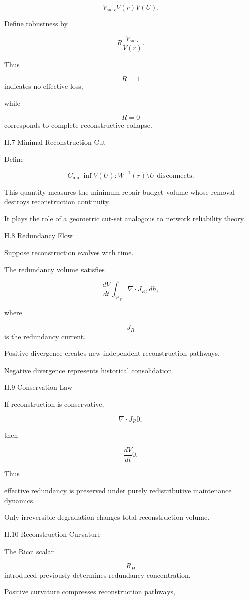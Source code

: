 \documentclass[12pt,oneside]{article}
\theoremstyle{plain}
\theoremstyle{definition}
\theoremstyle{remark}
\begin{document}
\[
V_{\mathrm{surv}}
V(r)

V(U).
\]

Define robustness by

\[
R
\frac{
V_{\mathrm{surv}}
}
{
V(r)
}.
\]

Thus

\[
R=1
\]
indicates no effective loss,

while

\[
R=0
\]
corresponds to complete reconstructive collapse.


H.7 Minimal Reconstruction Cut

Define

\[
C_{\min}
\inf
{
V(U):
W^{-1}(r)\setminus U
\text{ disconnects}
}.
\]

This quantity measures the minimum repair-budget volume whose removal destroys reconstruction continuity.

It plays the role of a geometric cut-set analogous to network reliability theory.


H.8 Redundancy Flow

Suppose reconstruction evolves with time.

The redundancy volume satisfies

\[
\frac{dV}{dt}
\int_{\mathcal H_r}
\nabla\cdot J_R
,dh,
\]

where

\[
J_R
\]
is the redundancy current.

Positive divergence creates new independent reconstruction pathways.

Negative divergence represents historical consolidation.


H.9 Conservation Law

If reconstruction is conservative,

\[
\nabla\cdot J_R
0,
\]

then

\[
\frac{dV}{dt}
0. 

\]

Thus

effective redundancy is preserved under purely redistributive maintenance dynamics.

Only irreversible degradation changes total reconstruction volume.


H.10 Reconstruction Curvature

The Ricci scalar

\[
R_H
\]
introduced previously determines redundancy concentration.

Positive curvature compresses reconstruction pathways,
\end{document}
